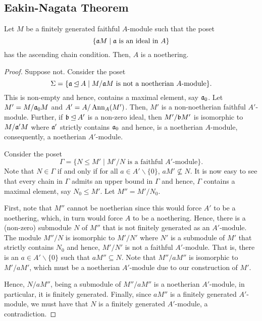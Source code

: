 \subsection{Eakin-Nagata Theorem}

\begin{lemma}[Formanek]
    Let $M$ be a finitely generated faithful $A$-module such that the poset 
    \begin{equation*}
        \{\mathfrak a M\mid \mathfrak a \text{ is an ideal in }A\}
    \end{equation*}
    has the ascending chain condition. Then, $A$ is a noethering.
\end{lemma}
\begin{proof}
    Suppose not. Consider the poset 
    \begin{equation*}
        \Sigma = \{\mathfrak a\unlhd A\mid M/\mathfrak a M\text{ is not a noetherian $A$-module}\}.
    \end{equation*}
    This is non-empty and hence, contains a maximal element, say $\mathfrak a_0$. Let $M' = M/\mathfrak a_0 M$ and $A' = A/\operatorname{Ann}_A(M')$. Then, $M'$ is a non-noetherian faithful $A'$-module. Further, if $\mathfrak b\unlhd A'$ is a non-zero ideal, then $M'/\mathfrak b M'$ is isomorphic to $M/\mathfrak a' M$ where $\mathfrak a'$ strictly contains $\mathfrak a_0$ and hence, is a noetherian $A$-module, consequently, a noetherian $A'$-module.

    Consider the poset 
    \begin{equation*}
        \Gamma = \{N\le M'\mid M'/N\text{ is a faithful $A'$-module}\}.
    \end{equation*}
    Note that $N\in\Gamma$ if and only if for all $a\in A'\backslash\{0\}$, $aM'\not\subseteq N$. It is now easy to see that every chain in $\Gamma$ admits an upper bound in $\Gamma$ and hence, $\Gamma$ contains a maximal element, say $N_0\le M'$. Let $M'' = M'/N_0$. 

    First, note that $M''$ cannot be noetherian since this would force $A'$ to be a noethering, which, in turn would force $A$ to be a noethering. Hence, there is a (non-zero) submodule $N$ of $M''$ that is not finitely generated as an $A'$-module. The module $M''/N$ is isomorphic to $M'/N'$ where $N'$ is a submodule of $M'$ that strictly contains $N_0$ and hence, $M'/N'$ is not a faithful $A'$-module. That is, there is an $a\in A'\backslash\{0\}$ such that $aM''\subseteq N$. Note that $M''/aM''$ is isomorphic to $M'/aM'$, which must be a noetherian $A'$-module due to our construction of $M'$. 
    
    Hence, $N/aM''$, being a submodule of $M''/aM''$ is a noetherian $A'$-module, in particular, it is finitely generated. Finally, since $aM''$ is a finitely generated $A'$-module, we must have that $N$ is a finitely generated $A'$-module, a contradiction.
\end{proof}


